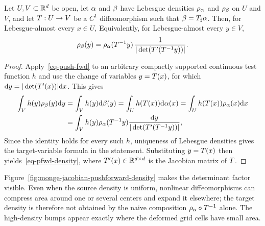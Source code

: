 \begin{prop}\label{prop-push-forward-densities}
	Let $U,V\subset\mathbb{R}^d$ be open, let $\alpha$ and $\beta$ have Lebesgue densities $\rho_{\alpha}$ and $\rho_{\beta}$ on $U$ and $V$, and let $T:U\to V$ be a $C^1$ diffeomorphism such that $\beta=T_\sharp\alpha$. Then, for Lebesgue-almost every $x\in U$,
	Equivalently, for Lebesgue-almost every $y\in V$,
	\[
		\rho_{\beta}(y)=\rho_{\alpha}(T^{-1}y)\,
		\frac{1}{|\det(T'(T^{-1}y))|}.
	\]
\end{prop}

\begin{proof}
	Apply~\eqref{eq-push-fwd} to an arbitrary compactly supported continuous test function $h$ and use the change of variables $y=T(x)$, for which $\mathrm{d} y = |\det(T'(x))| \mathrm{d} x$. This gives
\begin{align*}
	\int_V h(y)\rho_{\beta}(y) \mathrm{d} y &= \int_V h(y) \mathrm{d} \beta(y) = \int_U h(T(x)) \mathrm{d} \alpha(x) = \int_U h(T(x)) \rho_{\alpha}(x) \mathrm{d} x \\
		&= \int_V h(y) \rho_{\alpha}(T^{-1}y) \frac{\mathrm{d} y}{|\det(T'(T^{-1} y))|},
\end{align*}
	Since the identity holds for every such $h$, uniqueness of Lebesgue densities gives the target-variable formula in the statement. Substituting $y=T(x)$ then yields~\eqref{eq-pfwd-density}, where $T'(x)\in\mathbb{R}^{d\times d}$ is the Jacobian matrix of $T$.
\end{proof}

Figure~\ref{fig:monge-jacobian-pushforward-density} makes the determinant factor visible. Even when the source density is uniform, nonlinear diffeomorphisms can compress area around one or several centers and expand it elsewhere; the target density is therefore not obtained by the naive composition $\rho_{\alpha}\circ T^{-1}$ alone. The high-density bumps appear exactly where the deformed grid cells have small area.

